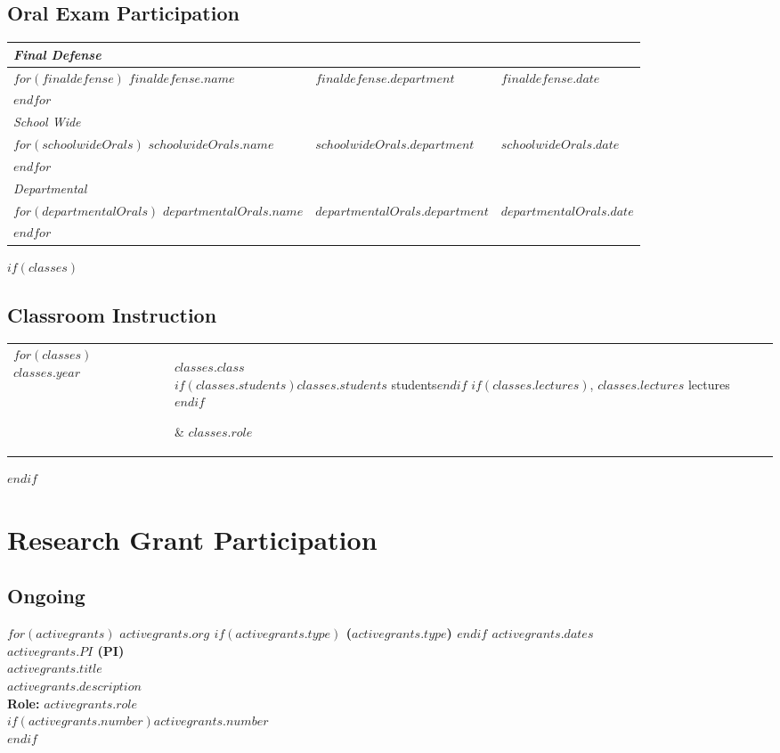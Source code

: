\documentclass[12pt, martgin, line]{article}
\begin{document}
\subsection*{Oral Exam Participation}
\setlength{\extrarowheight}{.25em}
\begin{longtable}[l]{lll}
 \emph{Final Defense}\\
 \hline
 $for(finaldefense)$
 $finaldefense.name$&
 $finaldefense.department$&
 $finaldefense.date$\\
 $endfor$
 \\
 \emph{School Wide}\\
 \hline
 $for(schoolwideOrals)$
 $schoolwideOrals.name$&
 $schoolwideOrals.department$&
 $schoolwideOrals.date$\\
 $endfor$
 \\
 \emph{Departmental}\\
 \hline
 $for(departmentalOrals)$
 $departmentalOrals.name$&
 $departmentalOrals.department$&
 $departmentalOrals.date$\\
 $endfor$
\end{longtable}
\setlength{\extrarowheight}{0em}


$if(classes)$
\subsection*{Classroom Instruction}
\setlength{\extrarowheight}{.75em}
\begin{longtable}[l]{lp{4in}l}
  $for(classes)$
  $classes.year$&
  \parbox[t]{4in} { $classes.class$\\
    \scriptsize{%
      $if(classes.students)$$classes.students$ students$endif$%
      $if(classes.lectures)$, $classes.lectures$ lectures$endif$%
    }} & $classes.role$\\
  $endfor$
\end{longtable}
\setlength{\extrarowheight}{0em}
$endif$


\section*{Research Grant Participation}

\subsection*{Ongoing}


$for(activegrants)$
\textbf{$activegrants.org$
$if(activegrants.type)$
 ($activegrants.type$)
$endif$
\hfill $activegrants.dates$\\
$activegrants.PI$ (PI)\\
$activegrants.title$}\\
$activegrants.description$\\
\textbf{Role:} $activegrants.role$\\
$if(activegrants.number)$$activegrants.number$\\$endif$
\end{document}
